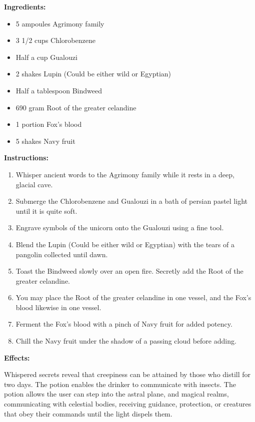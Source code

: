 \documentclass{article}
\begin{document}
\textbf{Ingredients:}

\begin{itemize}
  \item 5 ampoules Agrimony family
  \item 3 1/2 cups Chlorobenzene
  \item Half a cup Gualouzi
  \item 2 shakes Lupin (Could be either wild or Egyptian)
  \item Half a tablespoon Bindweed
  \item 690 gram Root of the greater celandine
  \item 1 portion Fox's blood
  \item 5 shakes Navy fruit
\end{itemize}

\textbf{Instructions:}

\begin{enumerate}
  \item Whisper ancient words to the Agrimony family while it rests in a deep, glacial cave.
  \item Submerge the Chlorobenzene and Gualouzi in a bath of persian pastel light until it is quite soft.
  \item Engrave symbols of the unicorn onto the Gualouzi using a fine tool.
  \item Blend the Lupin (Could be either wild or Egyptian) with the tears of a pangolin collected until dawn.
  \item Toast the Bindweed slowly over an open fire. Secretly add the Root of the greater celandine.
  \item You may place the Root of the greater celandine in one vessel, and the Fox's blood likewise in one vessel.
  \item Ferment the Fox's blood with a pinch of Navy fruit for added potency.
  \item Chill the Navy fruit under the shadow of a passing cloud before adding.
\end{enumerate}

\textbf{Effects:}

Whispered secrets reveal that creepiness can be attained by those who distill for two days. The potion enables the drinker to communicate with insects. The potion allows the user can step into the astral plane, and magical realms, communicating with celestial bodies, receiving guidance, protection, or creatures that obey their commands until the light dispels them.
\end{document}

